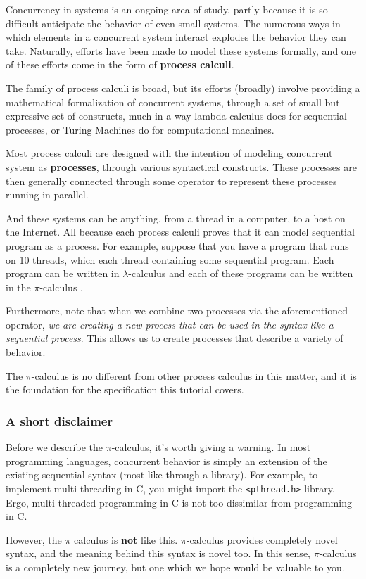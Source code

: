 Concurrency in systems is an ongoing area of study, partly because it is so difficult anticipate the behavior of even small systems. The numerous ways in which elements in a concurrent system interact explodes the behavior they can take. Naturally, efforts have been made to model these systems formally,  and one of these efforts come in the form of \textbf{process calculi}.

The family of process calculi is broad, but its efforts (broadly) involve providing a mathematical formalization of concurrent systems, through a set of small but expressive set of constructs, much in a way lambda-calculus does for sequential processes, or Turing Machines do for computational machines.

Most process calculi are designed with the intention of modeling concurrent system as \textbf{processes}, through various syntactical constructs. These processes are then generally connected through some operator to represent these processes running in parallel. 

And these systems can be anything, from a thread in a computer, to a host on the Internet. All because each process calculi proves that it can model sequential program as a process. For example, suppose that you have a program that runs on 10 threads, which each thread containing some sequential program. Each program can be written in $\lambda$-calculus  and each of these programs can be written in the $\pi$-calculus .

Furthermore, note that when we combine two processes via the aforementioned operator, \textit{we are creating a new process that can be used in the syntax like a sequential process}. This allows us to create processes that describe a variety of behavior.

The $\pi$-calculus is no different from other process calculus in this matter, and it is the foundation for the specification this tutorial covers. 

\subsubsection{A short disclaimer}

Before we describe the $\pi$-calculus, it's worth giving a warning. In most programming languages, concurrent behavior is simply an extension of the existing sequential syntax (most like through a library). For example, to implement multi-threading in C, you might import the \verb`<pthread.h>` library. Ergo, multi-threaded programming in C is not too dissimilar from programming in C.

However, the $\pi$ calculus is \textbf{not} like this. $\pi$-calculus provides completely novel syntax, and the meaning behind this syntax is novel too. In this sense, $\pi$-calculus is a completely new journey, but one which we hope would be valuable to you.